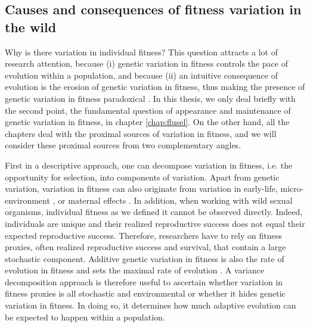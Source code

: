 \subsection{Causes and consequences of fitness variation in the wild}
Why is there variation in individual fitness? This question attracts a lot of research attention, because (i) genetic variation in fitness controls the pace of evolution within a population, and because (ii) an intuitive consequence of evolution is the erosion of genetic variation in fitness, thus making the presence of genetic variation in fitness paradoxical \parencite{Jones1987}. 
In this thesis, we only deal briefly with the second point, the fundamental question of appearance and maintenance of genetic variation in fitness, in chapter \ref{chap:flusel}.
On the other hand, all the chapters deal with the proximal sources of variation in fitness, and we will consider these proximal sources from two complementary angles. 

First in a descriptive approach, one can decompose variation in fitness, i.e. the opportunity for selection, into components of variation.
Apart from genetic variation, variation in fitness can also originate from variation in early-life, micro-environment \parencite{Turner2009}, or maternal effects \parencite{Wolf2009}. In addition, when working with wild sexual organisms, individual fitness as we defined it cannot be observed directly. Indeed, individuals are unique and their realized reproductive success does not equal their expected reproductive success. Therefore, researchers have to rely on fitness proxies, often realized reproductive success and survival, that contain a large stochastic component. Additive genetic variation in fitness is also the rate of evolution in fitness and sets the maximal rate of evolution \parencite{Fisher1930}. A variance decomposition approach is therefore useful to ascertain whether variation in fitness proxies is all stochastic and environmental or whether it hides genetic variation in fitness. In doing so, it determines how much adaptive evolution can be expected to happen within a population.


